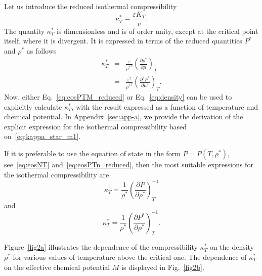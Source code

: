 \documentclass[fleqn,twoside,twocolumn,nofootinbib,showkeys]{revtex4} %
\begin{document}
	Let us introduce the reduced isothermal compressibility
	\begin{equation}
		\kappa^*_T \equiv \frac{\varepsilon K_T}{v}.
	\end{equation}
	The quantity $\kappa^*_T$ is dimensionless and is of order unity, except at the critical point itself, where it is divergent. It is expressed in terms of the reduced quantities $P^*$ and $\rho^*$ as follows
	\begin{eqnarray}
		\label{eq:kappa_star_m1}
		\kappa^*_T & = & \frac{\varepsilon}{{\rho^*}^2} \left(\frac{\partial \rho^*}{\partial \mu}\right)_T
		\\
		\label{eq:kappa_star_m}
		& = & \frac{\varepsilon^2}{{\rho^*}^2} \left(\frac{\partial^2 P^*}{\partial \mu^2}\right)_T.
	\end{eqnarray}
	Now, either Eq.~\eqref{eq:eosPTM_reduced} or Eq.~\eqref{eq:density} can be used to explicitly calculate $\kappa^*_T$, with the result expressed as a function of temperature and chemical potential. In Appendix~\ref{sec:app-a}, we provide the derivation of the explicit expression for the isothermal compressibility based on~\eqref{eq:kappa_star_m1}.
	
	If it is preferable to use the equation of state in the form $P=P(T, \rho^*)$, see~\eqref{eq:eosNT} and~\eqref{eq:eosPTn_reduced}, then the most suitable expressions for the isothermal compressibility are
	\begin{equation}
		\kappa_T = \frac{1}{\rho^*} \left(\frac{\partial P}{\partial \rho^*}\right)^{-1}_T
	\end{equation}
	and 
	\begin{equation}
		\kappa^*_T = \frac{1}{\rho^*} \left(\frac{\partial P^*}{\partial \rho^*}\right)^{-1}_T.
	\end{equation}
	
	Figure~\ref{fig2a} illustrates the dependence of the compressibility $\kappa^*_T$ on the density $\rho^*$ for various values of temperature above the critical one. The dependence of $\kappa^*_T$ on the effective chemical potential $M$ is displayed in Fig.~\ref{fig2b}.
	
\end{document}
